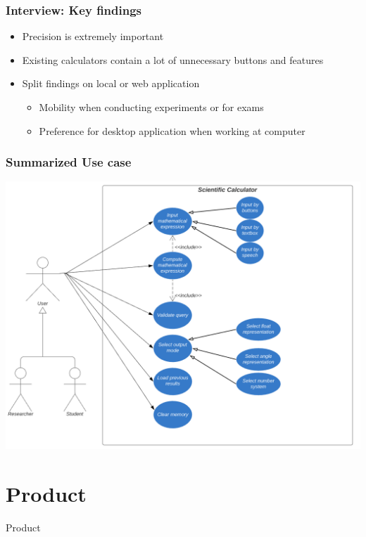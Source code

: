 \documentclass{beamer}
\begin{document}
\begin{frame}
\frametitle{Interview: Key findings}
\begin{itemize}
 \item Precision is extremely important
 \item Existing calculators contain a lot of unnecessary buttons and features
 \item Split findings on local or web application
  \begin{itemize}
   \item Mobility when conducting experiments or for exams
   \item Preference for desktop application when working at computer
  \end{itemize}
\end{itemize}
\end{frame}




\begin{frame}
\frametitle{Summarized Use case}
\includegraphics[scale=0.5]{Use Case}
\end{frame}


\section{Product}

\begin{frame}
\begin{center}
\Huge Product
\end{center}
\end{frame}
\end{document}
